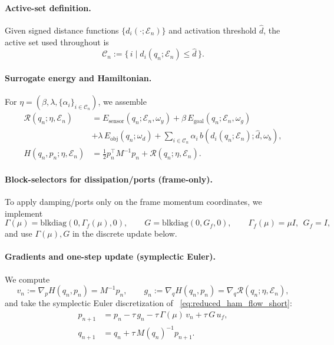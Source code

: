 \documentclass{article} %
\begin{document}
\paragraph{Active-set definition.}
Given signed distance functions $\{d_i(\cdot;\mathcal{E}_n)\}$ and activation threshold $\hat d$, the
active set used throughout is
\begin{equation}
\label{eq:impl:active_set}
\mathcal{C}_n := \{\, i \mid d_i(q_n;\mathcal{E}_n)\le \hat d \,\}.
\end{equation}

\paragraph{Surrogate energy and Hamiltonian.}
For $\eta=(\beta,\lambda,\{\alpha_i\}_{i\in\mathcal{C}_n})$, we assemble
\begin{align}
\label{eq:impl:surrogate_energy}
\mathcal{R}(q_n;\eta,\mathcal{E}_n)
&=
E_{\mathrm{sensor}}(q_n;\mathcal{E}_n,\omega_y)
+\beta\,E_{\mathrm{goal}}(q_n;\mathcal{E}_n,\omega_g) \\
&+\lambda\,E_{\mathrm{obj}}(q_n;\omega_d)
+\sum_{i\in\mathcal{C}_n}\alpha_i\, b(d_i(q_n;\mathcal{E}_n);\hat d,\omega_b),\\
\label{eq:impl:surrogate_hamiltonian}
H(q_n,p_n;\eta,\mathcal{E}_n)
&=\tfrac12 p_n^\top M^{-1}p_n+\mathcal{R}(q_n;\eta,\mathcal{E}_n).
\end{align}

\paragraph{Block-selectors for dissipation/ports (frame-only).}
To apply damping/ports only on the frame momentum coordinates, we implement
\begin{equation}
\label{eq:impl:block_selectors}
\Gamma(\mu) = \mathrm{blkdiag}(0,\Gamma_f(\mu),0),\qquad
G = \mathrm{blkdiag}(0,G_f,0),\qquad
\Gamma_f(\mu)=\mu I,\ \ G_f=I,
\end{equation}
and use $\Gamma(\mu),G$ in the discrete update below.

\paragraph{Gradients and one-step update (symplectic Euler).}
We compute
\begin{equation}
\label{eq:impl:gradients}
v_n := \nabla_p H(q_n,p_n)=M^{-1}p_n,\qquad
g_n := \nabla_q H(q_n,p_n)=\nabla_q \mathcal{R}(q_n;\eta,\mathcal{E}_n),
\end{equation}
and take the symplectic Euler discretization of ~\cref{eq:reduced_ham_flow_short}:
\begin{align}
\label{eq:impl:ph_euler_p}
p_{n+1} &= p_n-\tau\,g_n-\tau\,\Gamma(\mu)\,v_n+\tau\,G\,u_f,\\
\label{eq:impl:ph_euler_q}
q_{n+1} &= q_n+\tau\,M(q_n)^{-1}p_{n+1}.
\end{align}
\end{document}

